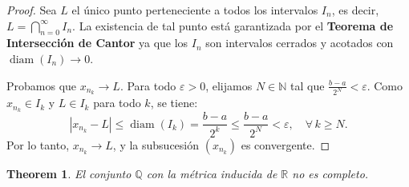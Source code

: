\documentclass[11pt,a4paper]{article}
\theoremstyle{plain}
\newtheorem{theorem}{Theorem}[section]
\theoremstyle{definition}
\begin{document}
\begin{proof}
Sea $L$ el único punto perteneciente a todos los intervalos $I_n$, es decir, $L = \bigcap_{n=0}^{\infty} I_n$. La existencia de tal punto está garantizada por el \textbf{Teorema de Intersección de Cantor} ya que los $I_n$ son intervalos cerrados y acotados con $\operatorname{diam}(I_n) \to 0$.

Probamos que $x_{n_k} \to L$. Para todo $\varepsilon > 0$, elijamos $N \in \mathbb{N}$ tal que $\frac{b-a}{2^N} < \varepsilon$. Como $x_{n_k} \in I_k$ y $L \in I_k$ para todo $k$, se tiene:
\[
|x_{n_k} - L| \leq \operatorname{diam}(I_k) = \frac{b-a}{2^k} \leq \frac{b-a}{2^N} < \varepsilon, \quad \forall\, k \geq N.
\]
Por lo tanto, $x_{n_k} \to L$, y la subsucesión $(x_{n_k})$ es convergente.
\end{proof}

\begin{theorem}\label{thm:q_no_completo}
El conjunto $\mathbb{Q}$ con la métrica inducida de $\mathbb{R}$ no es completo.
\end{theorem}
\end{document}
